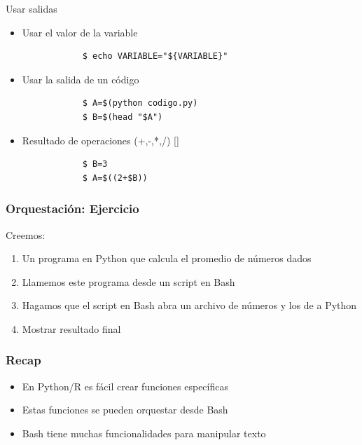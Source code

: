 \documentclass[14pt,aspectratio=169,xcolor=dvipsnames]{beamer}
\begin{document}
\begin{frame}[fragile]{Usar salidas}
    \begin{itemize}
        \item Usar el valor de la variable
            \begin{verbatim}
            $ echo VARIABLE="${VARIABLE}"
            \end{verbatim}
        \item Usar la salida de un código
            \begin{verbatim}
            $ A=$(python codigo.py)
            $ B=$(head "$A")
            \end{verbatim}
        \item Resultado de operaciones (+,-,*,/) []
            \begin{verbatim}
            $ B=3
            $ A=$((2+$B))
            \end{verbatim}
    \end{itemize}
\end{frame}
\begin{frame}[fragile]\frametitle{Orquestación: Ejercicio}
    Creemos: 
    \begin{enumerate}
        \item Un programa en Python que calcula el promedio de números dados
        \item Llamemos este programa desde un script en Bash
        \item Hagamos que el script en Bash abra un archivo de números y los de a Python
        \item Mostrar resultado final
    \end{enumerate}
\end{frame}
\begin{frame}\frametitle{Recap}
    \begin{itemize}
        \item En Python/R es fácil crear funciones específicas
        \item Estas funciones se pueden orquestar desde Bash
        \item Bash tiene muchas funcionalidades para manipular texto
    \end{itemize}
\end{frame}
\end{document}
